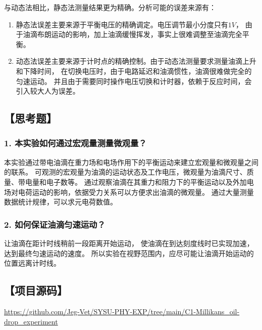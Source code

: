 \documentclass[12pt,a4paper,UTF8]{ctexart}
\begin{document}
    与动态法相比，静态法测量结果更为精确。分析可能的误差来源有：
    \begin{enumerate}[label=\arabic*.]
        \item 静态法误差主要来源于平衡电压的精确调定。电压调节最小分度只有$1V$，
        由于油滴布朗运动的影响，加上油滴缓慢挥发，事实上很难调整至油滴完全平衡。
        \item 动态法误差主要来源于计时点的精确控制。由于动态法测量要求测量油滴上升和下降时间，
        在切换电压时，由于电路延迟和油滴惯性，油滴很难做完全的匀速运动。
        并且由于需要同时操作电压切换和计时器，依赖于反应时间，会引入较大人为误差。
    \end{enumerate}

\subsection*{【思考题】}
    \subsubsection*{1. 本实验如何通过宏观量测量微观量？}
    本实验通过带电油滴在重力场和电场作用下的平衡运动来建立宏观量和微观量之间的联系。
    可观测的宏观量为油滴的运动状态及工作电压，微观量为油滴尺寸、质量、带电量和电子数等。
    通过观察油滴在其重力和阻力下的平衡运动以及外加电场对电荷运动的影响，依据受力关系可以方便求出油滴的微观量。
    通过大量测量数据统计规律，可以求元电荷数值。

    \subsubsection*{2. 如何保证油滴匀速运动？}
    让油滴在距计时线稍前一段距离开始运动，
    使油滴在到达刻度线时已实现加速，达到最终匀速运动的速度。
    所以实验在视野范围内，应尽可能让油滴开始运动的位置远离计时线。


\subsection*{【项目源码】}
\url{https://github.com/Jeg-Vet/SYSU-PHY-EXP/tree/main/C1-Millikans_oil-drop_experiment}
\end{document}
